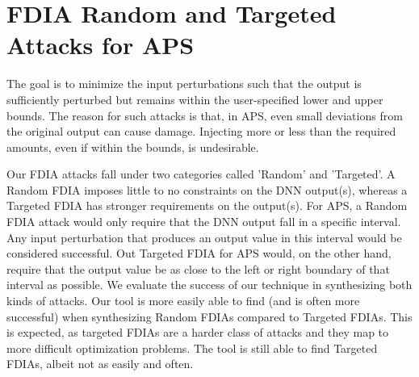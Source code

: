 \section{FDIA Random and Targeted Attacks for APS}
The goal is to minimize the input perturbations such that the output is sufficiently perturbed but remains within the user-specified lower and upper bounds. The reason for such attacks is that, in APS, even small deviations from the original output can cause damage. Injecting more or less than the required amounts, even if within the bounds, is undesirable.

Our FDIA attacks fall under two categories called 'Random' and 'Targeted'. A Random FDIA imposes little to no constraints on the DNN output(s), whereas a Targeted FDIA has stronger requirements on the output(s).
For APS, a Random FDIA attack would only require that the DNN output fall in a specific interval. Any input perturbation that produces an output value in this interval would be considered successful.
Out Targeted FDIA for APS would, on the other hand, require that the output value be as close to the left or right boundary of that interval as possible. We evaluate the success of our technique in synthesizing both kinds of attacks.
Our tool is more easily able to find (and is often more successful) when synthesizing Random FDIAs compared to Targeted FDIAs. This is expected, as targeted FDIAs are a harder class of attacks and they map to more difficult optimization problems.
The tool is still able to find Targeted FDIAs, albeit not as easily and often.



